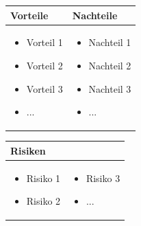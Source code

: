 \begin{table}[h]
\begin{tabular}{p{} | p{}}


 \textbf{Vorteile} & \textbf{Nachteile} \\ \hline
	 
\begin{itemize}
\item Vorteil 1
\item Vorteil 2
\item Vorteil 3
\item ...
\end{itemize}

 
 &
 
\begin{itemize}
\item Nachteil 1
\item Nachteil 2
\item Nachteil 3
\item ...
\end{itemize}

\end{tabular}
\end{table}

\begin{table}[h]
\begin{tabular}{p{}p{}}


 \textbf{Risiken} & \\ \hline
	 
\begin{itemize}
\item Risiko 1
\item Risiko 2
\end{itemize}
&
\begin{itemize}
\item Risiko 3
\item ...
\end{itemize}

 
\end{tabular}
\end{table}

\pagebreak